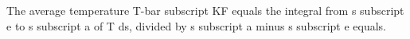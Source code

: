 The average temperature T-bar subscript KF equals the integral from s subscript e to s subscript a of T ds, divided by s subscript a minus s subscript e equals.